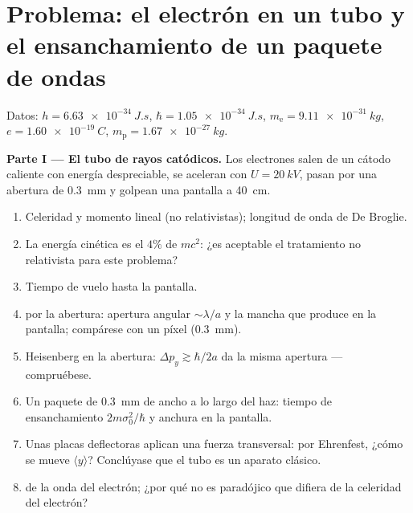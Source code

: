 \section{Problema: el electrón en un tubo y el ensanchamiento de un paquete de ondas}

\begin{problem}\label{pb:b2:schrodinger-wave-functions:1}
Datos: $h = \qty{6.63e-34}{J.s}$, $\hbar = \qty{1.05e-34}{J.s}$, $m_{\text{e}} =
\qty{9.11e-31}{kg}$, $e = \qty{1.60e-19}{C}$, $m_{\text{p}} = \qty{1.67e-27}{kg}$.

\textbf{Parte I --- El tubo de rayos catódicos.}
Los electrones salen de un cátodo caliente con energía despreciable, se aceleran
con $U = \qty{20}{kV}$, pasan por una abertura de \qty{0.3}{mm} y golpean una
pantalla a \qty{40}{cm}.
\begin{enumerate}
  \item Celeridad y momento lineal (no relativistas); longitud de onda de De Broglie.
  \item La energía cinética es el $4\%$ de $mc^2$: ¿es aceptable el tratamiento
        no relativista para este problema?
  \item Tiempo de vuelo hasta la pantalla.
  \item {} por la abertura: apertura angular $\sim\lambda/a$ y
        la mancha que produce en la pantalla; compárese con un píxel
        (\qty{0.3}{mm}).
  \item Heisenberg en la abertura: $\Delta p_y \gtrsim \hbar/2a$ da la
        misma apertura --- compruébese.
  \item Un paquete de \qty{0.3}{mm} de ancho a lo largo del haz: tiempo de ensanchamiento
        $2m\sigma_0^2/\hbar$ y anchura en la pantalla.
  \item Unas placas deflectoras aplican una fuerza transversal: por Ehrenfest, ¿cómo
        se mueve $\langle y\rangle$? Conclúyase que el tubo es un
        aparato clásico.
  \item {} de la onda del electrón; ¿por qué no es paradójico que
        difiera de la celeridad del electrón?
\end{enumerate}


\end{problem}
